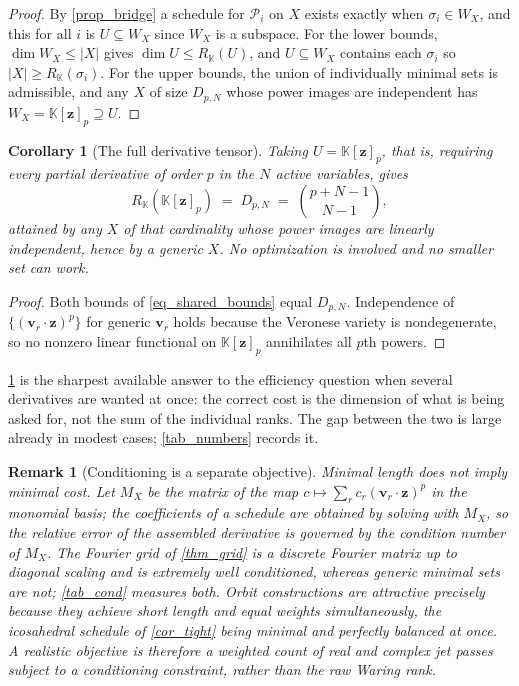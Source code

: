\documentclass[final]{siamltex}
\newtheorem{corollary}[corollary]{Corollary}
\newtheorem{remark}[remark]{Remark}
\newcommand{\K}{\mathbb{K}}
\newcommand{\bz}{\bm{z}}
\newcommand{\bv}{\bm{v}}
\newcommand{\abs}[1]{\left|#1\right|}
\begin{document}
\begin{proof}
  By \cref{prop_bridge} a schedule for $\mathcal{P}_{i}$ on $X$ exists exactly
  when $\sigma_{i} \in W_{X}$, and this for all $i$ is $U \subseteq W_{X}$ since
  $W_{X}$ is a subspace.  For the lower bounds, $\dim W_{X} \le \abs{X}$ gives
  $\dim U \le R_{\K}(U)$, and $U \subseteq W_{X}$ contains each $\sigma_{i}$ so
  $\abs{X} \ge R_{\K}(\sigma_{i})$.  For the upper bounds, the union of
  individually minimal sets is admissible, and any $X$ of size $D_{p,N}$ whose
  power images are independent has $W_{X} = \K[\bz]_{p} \supseteq U$.
\end{proof}

\begin{corollary}[The full derivative tensor]\label{cor_fulltensor}
  Taking $U = \K[\bz]_{p}$, that is, requiring every partial derivative of order
  $p$ in the $N$ active variables, gives
  \begin{equation}\label{eq_fulltensor}
    R_{\K}(\K[\bz]_{p}) \;=\; D_{p,N} \;=\; \binom{p+N-1}{N-1},
  \end{equation}
  attained by any $X$ of that cardinality whose power images are linearly
  independent, hence by a generic $X$.  No optimization is involved and no
  smaller set can work.
\end{corollary}

\begin{proof}
  Both bounds of \eqref{eq_shared_bounds} equal $D_{p,N}$.  Independence of
  $\{(\bv_{r}\cdot\bz)^{p}\}$ for generic $\bv_{r}$ holds because the Veronese
  variety is nondegenerate, so no nonzero linear functional on $\K[\bz]_{p}$
  annihilates all $p$th powers.
\end{proof}

\cref{cor_fulltensor} is the sharpest available answer to the efficiency
question when several derivatives are wanted at once: the correct cost is the
dimension of what is being asked for, not the sum of the individual ranks.  The
gap between the two is large already in modest cases; \cref{tab_numbers}
records it.

\begin{remark}[Conditioning is a separate objective]\label{rmk_cond}
  Minimal length does not imply minimal cost.  Let $M_{X}$ be the matrix of the
  map $c \mapsto \sum_{r}c_{r}(\bv_{r}\cdot\bz)^{p}$ in the monomial basis; the
  coefficients of a schedule are obtained by solving with $M_{X}$, so the
  relative error of the assembled derivative is governed by the condition number
  of $M_{X}$.  The Fourier grid of \cref{thm_grid} is a discrete Fourier matrix
  up to diagonal scaling and is extremely well conditioned, whereas generic
  minimal sets are not; \cref{tab_cond} measures both.  Orbit constructions are
  attractive precisely because they achieve short length and equal weights
  simultaneously, the icosahedral schedule of \cref{cor_tight} being minimal and
  perfectly balanced at once.  A realistic objective is therefore a weighted
  count of real and complex jet passes subject to a conditioning constraint,
  rather than the raw Waring rank.
\end{remark}
\end{document}
